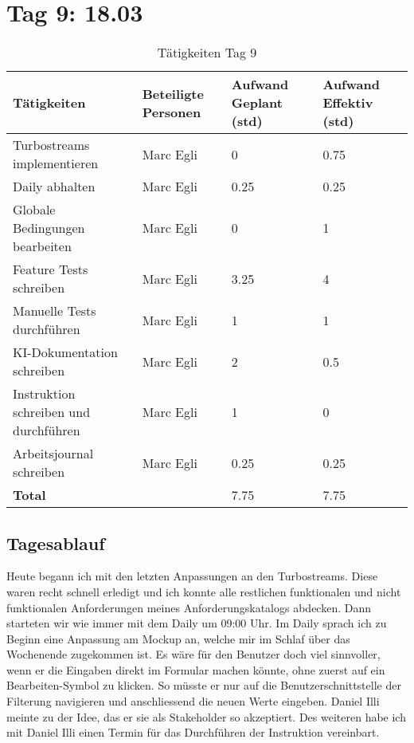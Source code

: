 \section{Tag 9: 18.03}
\begin{table}[H]
    \begin{tabular}{|L{0.4\textwidth}|C{60pt}|C{60pt}|C{60pt}|}
        \hline
        \color{white}Tätigkeiten & \color{white}Beteiligte \color{white}Personen & \color{white}Aufwand Geplant (std) & \color{white}Aufwand Effektiv (std) \\
        \hline
         Turbostreams implementieren & Marc Egli & 0 & 0.75 \\
        \hline
        Daily abhalten & Marc Egli & 0.25 & 0.25 \\
        \hline
        Globale Bedingungen bearbeiten & Marc Egli & 0 & 1 \\
        \hline
        Feature Tests schreiben & Marc Egli & 3.25 & 4 \\
        \hline
        Manuelle Tests durchführen & Marc Egli & 1 & 1 \\
        \hline
        KI-Dokumentation schreiben & Marc Egli & 2 & 0.5 \\
        \hline
        Instruktion schreiben und durchführen & Marc Egli & 1 & 0 \\
        \hline
        Arbeitsjournal schreiben & Marc Egli & 0.25 & 0.25 \\
        \hline
        \textbf{Total} &  & 7.75  & 7.75 \\
        \hline
    \end{tabular}
    \caption{Tätigkeiten Tag 9}
\end{table}

\subsection*{Tagesablauf}
Heute begann ich mit den letzten Anpassungen an den Turbostreams. Diese waren recht schnell erledigt und ich konnte alle restlichen funktionalen und nicht
funktionalen Anforderungen meines Anforderungskatalogs abdecken. Dann starteten wir wie immer mit dem Daily um 09:00 Uhr.
Im Daily sprach ich zu Beginn eine Anpassung am Mockup an, welche mir im Schlaf über das Wochenende zugekommen ist. Es wäre für den Benutzer doch viel sinnvoller, 
wenn er die Eingaben direkt im Formular machen könnte, ohne zuerst auf ein Bearbeiten-Symbol zu klicken. So müsste er nur auf die Benutzerschnittstelle der Filterung navigieren
und anschliessend die neuen Werte eingeben. Daniel Illi meinte zu der Idee, das er sie als Stakeholder so akzeptiert. 
Des weiteren habe ich mit Daniel Illi einen Termin für das Durchführen der Instruktion vereinbart. 

